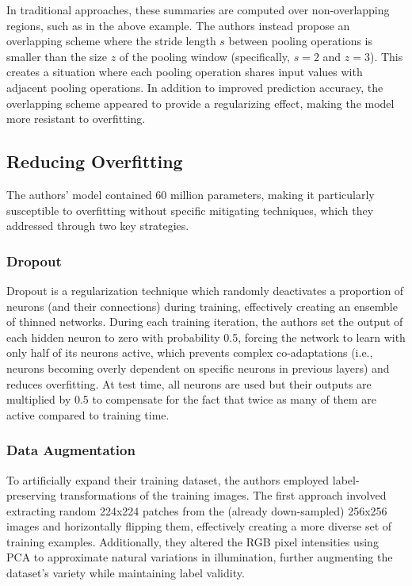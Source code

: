 \documentclass[10pt]{article}
\begin{document}
In traditional approaches, these summaries are computed over non-overlapping regions, such as in the above example. The authors instead propose an overlapping scheme where the stride length \(s\) between pooling operations is smaller than the size \(z\) of the pooling window (specifically, \(s=2\) and \(z=3\)). This creates a situation where each pooling operation shares input values with adjacent pooling operations. In addition to improved prediction accuracy, the overlapping scheme appeared to provide a regularizing effect, making the model more resistant to overfitting.


\subsection*{Reducing Overfitting}
The authors' model contained 60 million parameters, making it particularly susceptible to overfitting without specific mitigating techniques, which they addressed through two key strategies.

\subsubsection*{Dropout}
Dropout is a regularization technique which randomly deactivates a proportion of neurons (and their connections) during training, effectively creating an ensemble of thinned networks. During each training iteration, the authors set the output of each hidden neuron to zero with probability 0.5, forcing the network to learn with only half of its neurons active, which prevents complex co-adaptations (i.e., neurons becoming overly dependent on specific neurons in previous layers) and reduces overfitting. At test time, all neurons are used but their outputs are multiplied by 0.5 to compensate for the fact that twice as many of them are active compared to training time.

\subsubsection*{Data Augmentation}
To artificially expand their training dataset, the authors employed label-preserving transformations of the training images. The first approach involved extracting random 224x224 patches from the (already down-sampled) 256x256 images and horizontally flipping them, effectively creating a more diverse set of training examples. Additionally, they altered the RGB pixel intensities using PCA to approximate natural variations in illumination, further augmenting the dataset's variety while maintaining label validity.
\end{document}
